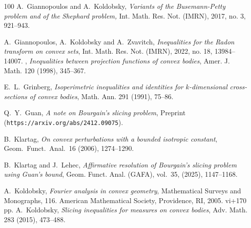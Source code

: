 \documentclass[11pt,leqno]{article}
\theoremstyle{definition}
\theoremstyle{remark}
\numberwithin{equation}{section}
\newcommand{\1}{\textbf{1}}
\begin{document}
\begin{thebibliography}{100}
 {\rm A.~Giannopoulos and A.~Koldobsky}, {\sl Variants of the Busemann-Petty problem
and of the Shephard problem,} Int. Math. Res. Not. (IMRN), 2017, no. 3, 921--943.

 {\rm A.~Giannopoulos, A.~Koldobsky and A.~Zvavitch},
{\sl Inequalities for the Radon transform on convex sets}, Int. Math. Res. Not. (IMRN), 2022, no. 18, 13984--14007.
, \textit{Inequalities between projection functions of convex bodies},
Amer. J. Math. {120} (1998), 345--367.

 {\rm E.~L.~Grinberg}, \textit{Isoperimetric inequalities and identities for $k$-dimensional cross-sections of
convex bodies}, Math. Ann. {291} (1991), 75--86.

 Q.~Y.~Guan, \textit{A note on Bourgain's slicing problem}, Preprint ({\tt https://arxiv.org/abs/2412.09075}).



 \textrm{B.\ Klartag}, \textit{On convex perturbations with a bounded isotropic constant},
Geom.\ Funct.\ Anal.\ {16} (2006), 1274--1290.

 B.~Klartag and J.~Lehec, \textit{Affirmative resolution of Bourgain's slicing problem using
Guan's bound}, Geom. Funct. Anal. (GAFA), vol.~35, (2025), 1147--1168.



 {A.~Koldobsky}, \textit{Fourier analysis in convex geometry},
Mathematical Surveys and Monographs, 116. American Mathematical Society, Providence, RI, 2005. vi+170 pp.
 {A.~Koldobsky}, \textit{Slicing inequalities for measures on convex bodies},
Adv. Math. 283 (2015), 473--488.


\end{thebibliography}
\end{document}
